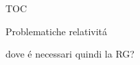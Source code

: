 \begin{frame}[label={intro}]{TOC}

\tableofcontents[onlyparts]

\end{frame}

\begin{wordonframe}{Problematiche relativit\'a}

dove \'e necessari quindi la RG?

\end{wordonframe}


